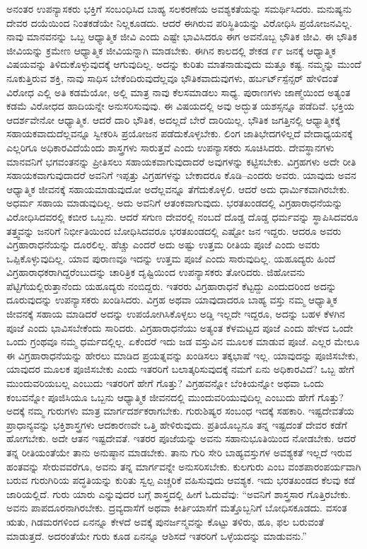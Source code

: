 ಅನಂತರ ಉಪನ್ಯಾಸಕರು ಭಕ್ತಿಗೆ ಸಂಬಂಧಿಸಿದ ಬಾಹ್ಯ ಸಲಕರಣೆಯ ಅವಶ್ಯಕತೆಯನ್ನು ಸಮರ್ಥಿಸಿದರು. ಮನುಷ್ಯನು ದೇವರ ದಯೆಯಿಂದ ನಿಂತಕಡೆಯೇ ನಿಲ್ಲಕೂಡದು. ಆದರೆ ಈಗಿರುವ ಪರಿಸ್ಥಿತಿಯನ್ನು ವಿರೋಧಿಸಿ ಪ್ರಯೋಜನವಿಲ್ಲ. ನಾವು ಮಾನವನನ್ನು ಒಬ್ಬ ಆಧ್ಯಾತ್ಮಿಕ ಜೀವಿ ಎಂದು ಎಷ್ಟೇ ಭಾವಿಸಿದರೂ ಈಗ ಅವನೊಬ್ಬ ಭೌತಿಕ ಜೀವಿ. ಈ ಭೌತಿಕ ಜೀವಿಯನ್ನು ಕ್ರಮೇಣ ಆಧ್ಯಾತ್ಮಿಕ ಜೀವಿಯನ್ನಾಗಿ ಮಾಡಬೇಕು. ಈಗಿನ ಕಾಲದಲ್ಲಿ ಶೇಕಡ ೯೯ ಜನಕ್ಕೆ ಆಧ್ಯಾತ್ಮಿಕ ವಿಷಯವನ್ನು ತಿಳಿದುಕೊಳ್ಳುವುದಕ್ಕೆ ಆಗುವುದಿಲ್ಲ. ಅದನ್ನು ಕುರಿತು ಮಾತನಾಡುವುದು ಮತ್ತೂ ಕಷ್ಟ. ನಮ್ಮನ್ನು ಮುಂದೆ ನೂಕುತ್ತಿರುವ ಶಕ್ತಿ, ನಾವು ಸಾಧಿಸ ಬೇಕೆಂದಿರುವುದೆಲ್ಲವೂ ಭೌತಿಕವಾದುವುಗಳು, ಹರ್ಬರ್ಟ್​ ಸ್ಪೆನ್ಸರ್​ ಹೇಳಿದಂತೆ ವಿರೋಧ ಎಲ್ಲಿ ಅತಿ ಕಡಮೆಯೋ, ಅಲ್ಲಿ ಮಾತ್ರ ನಾವು ಕೆಲಸಮಾಡಲು ಸಾಧ್ಯ. ಪುರಾಣಗಳು ಜಾಣ್ಮೆಯಿಂದ ಅತ್ಯಂತ ಕಡಮೆ ವಿರೋಧದ ಹಾದಿಯನ್ನೇ ಅನುಸರಿಸುವುವು. ಈ ವಿಷಯದಲ್ಲಿ ಅವು ಅದ್ಭುತ ಯಶಸ್ಸನ್ನೂ ಪಡೆದಿವೆ. ಭಕ್ತಿಯ ಆದರ್ಶವೇನೋ ಆಧ್ಯಾತ್ಮಿಕ. ಆದರೆ ದಾರಿ ಭೌತಿಕ, ಅದಲ್ಲದೆ ಬೇರೆ ದಾರಿಯಿಲ್ಲ. ಭೌತಿಕ ಜಗತ್ತಿನಲ್ಲಿ ಆಧ್ಯಾತ್ಮಿಕಕ್ಕೆ ಸಹಾಯಕವಾದುದೆಲ್ಲವನ್ನೂ ಸ್ವೀಕರಿಸಿ ಪ್ರಯೋಜನ ಪಡೆದುಕೊಳ್ಳಬೇಕು. ಲಿಂಗ ಜಾತಿಭೇದಗಳಿಲ್ಲದೆ ವೇದಾಧ್ಯಯನಕ್ಕೆ ಎಲ್ಲರಿಗೂ ಅಧಿಕಾರವಿದೆಯೆಂದು ಶಾಸ್ತ್ರಗಳು ಸಾರುತ್ತವೆ ಎಂದು ಉಪನ್ಯಾಸಕರು ಸೂಚಿಸಿದರು. ದೇವಸ್ಥಾನಗಳು ಮಾನವನಿಗೆ ಭಗವಂತನನ್ನು ಪ್ರೀತಿಸಲು ಸಹಾಯಕವಾಗುವುದಾದರೆ ಅವುಗಳನ್ನು ಕಟ್ಟಿಸಬೇಕು. ವಿಗ್ರಹಗಳು ಅದೇ ರೀತಿ ಸಹಾಯಕವಾಗುವುದಾದರೆ ಅವನಿಗೆ ಇಪ್ಪತ್ತು ವಿಗ್ರಹಗಳನ್ನು ಬೇಕಾದರೂ ಕೊಡಿ–ಎಂದರು ಅವರು. ಯಾವುದು ಅವನ ಆಧ್ಯಾತ್ಮಿಕ ಜೀವನಕ್ಕೆ ಸಹಾಯಮಾಡುವುದೋ ಅದೆಲ್ಲವನ್ನೂ ತೆಗೆದುಕೊಳ್ಳಲಿ. ಆದರೆ ಅದು ಧಾರ್ಮಿಕವಾಗಿರಬೇಕು. ಅಧರ್ಮ ಸಹಾಯ ಮಾಡುವುದಿಲ್ಲ. ಅದು ಅವನಿಗೆ ಆತಂಕವಾಗುವುದು. ಭರತಖಂಡದಲ್ಲಿ ವಿಗ್ರಹಾರಾಧನೆಯನ್ನು ವಿರೋಧಿಸಿದವರಲ್ಲಿ ಕಬೀರ ಒಬ್ಬನು. ಆದರೆ ಸಗುಣ ದೇವರಲ್ಲಿ ನಂಬದೆ ದೊಡ್ಡ ದೊಡ್ಡ ಧರ್ಮವನ್ನು ಸ್ಥಾಪಿಸಿದವರೂ ತತ್ತ್ವವನ್ನು ಜನರಿಗೆ ನಿರ್ಭೀತಿಯಿಂದ ಬೋಧಿಸಿದವರೂ ಭರತಖಂಡದಲ್ಲಿ ಎಷ್ಟೋ ಜನ ಇದ್ದರು. ಆದರೂ ಅವರು ವಿಗ್ರಹಾರಾಧನೆಯನ್ನು ದೂರಲಿಲ್ಲ. ಹೆಚ್ಚು ಎಂದರೆ ಅದು ಅಷ್ಟು ಉತ್ತಮ ರೀತಿಯ ಪೂಜೆ ಎಂದು ಅವರು ಒಪ್ಪಿಕೊಳ್ಳುವುದಿಲ್ಲ. ಯಾವ ಪುರಾಣವೂ ಇದನ್ನು ಉತ್ತಮ ಪೂಜೆ ಎಂದು ಸಾರುವುದಿಲ್ಲ. ಯಹೂದ್ಯರು ಹಿಂದೆ ವಿಗ್ರಹಾರಾಧಕರಾಗಿದ್ದರೆಂಬುದನ್ನು ಚಾರಿತ್ರಿಕ ದೃಷ್ಟಿಯಿಂದ ಉಪನ್ಯಾಸಕರು ತೋರಿದರು. ಜಿಹೋವನು ಪೆಟ್ಟಿಗೆಯಲ್ಲಿರುತ್ತಾನೆಂದು ಯಹೂದ್ಯರು ನಂಬಿದ್ದರು. ಇತರರು ವಿಗ್ರಹಾರಾಧನೆ ಕೆಟ್ಟದ್ದು ಎಂದುದರಿಂದ ಅದನ್ನು ದೂರುವುದನ್ನು ಉಪನ್ಯಾಸಕರು ಖಂಡಿಸಿದರು. ವಿಗ್ರಹ ಅಥವಾ ಯಾವುದಾದರೂ ಬಾಹ್ಯ ವಸ್ತು ನಮ್ಮ ಆಧ್ಯಾತ್ಮಿಕ ಜೀವನಕ್ಕೆ ಸಹಾಯ ಮಾಡಿದರೆ ಅದನ್ನು ಉಪಯೋಗಿಸಿಕೊಳ್ಳಲು ಅಡ್ಡಿ ಇಲ್ಲದೇ ಇದ್ದರೂ, ಅದನ್ನು ಬಹಳ ಕೆಳಗಿನ ಪೂಜೆ ಎಂದು ಭಾವಿಸಬೇಕೆಂದು ಸಾರಿದರು. ವಿಗ್ರಹಾರಾಧನೆಯು ಅತ್ಯಂತ ಕೆಳಮಟ್ಟದ ಪೂಜೆ ಎಂದು ಹೇಳದ ಒಂದೇ ಒಂದು ಗ್ರಂಥವೂ ನಮ್ಮ ಧರ್ಮದಲ್ಲಿಲ್ಲ. ಏಕೆಂದರೆ ಇದು ಜಡ ವಸ್ತುವಿನ ಮೂಲಕ ಮಾಡುವ ಪೂಜೆ. ಎಲ್ಲರ ಮೇಲೂ ಈ ವಿಗ್ರಹಾರಾಧನೆಯನ್ನು ಹೇರಲು ಮಾಡಿದ ಪ್ರಯತ್ನವನ್ನು ಖಂಡಿಸಲು ತಕ್ಕಭಾಷೆ ಇಲ್ಲ. ಯಾವುದನ್ನು ಪೂಜಿಸಬೇಕು, ಯಾವುದರ ಮೂಲಕ ಪೂಜಿಸಬೇಕು ಎಂದು ಇತರರಿಗೆ ಬಲಾತ್ಕರಿಸುವುದಕ್ಕೆ ನಮಗೆ ಏನು ಅಧಿಕಾರವಿದೆ? ಒಬ್ಬ ಹೇಗೆ ಮುಂದುವರಿಯಬಲ್ಲ ಎಂಬುದು ಇತರರಿಗೆ ಹೇಗೆ ಗೊತ್ತು? ವಿಗ್ರಹವನ್ನೋ ಬೆಂಕಿಯನ್ನೋ ಅಥವಾ ಒಂದು ಕಂಬವನ್ನೋ ಪೂಜಿಸಿಯೂ ಒಬ್ಬನು ಆಧ್ಯಾತ್ಮಿಕ ಜೀವನದಲ್ಲಿ ಮುಂದುವರಿಯುವುದಿಲ್ಲ ಎಂಬುದು ಹೇಗೆ ಗೊತ್ತು? ಅದಕ್ಕೆ ನಮ್ಮ ಗುರುಗಳು ಮಾತ್ರ ಮಾರ್ಗದರ್ಶಕರಾಗಬೇಕು. ಗುರುಶಿಷ್ಯರ ಸಂಬಂಧ ಇದಕ್ಕೆ ಸಹಕಾರಿ. ಇಷ್ಟದೇವತೆಯ ಪ್ರಾಧಾನ್ಯವನ್ನು ಭಕ್ತಿಶಾಸ್ತ್ರಗಳು ಆದಕಾರಣವೇ ಒತ್ತಿ ಹೇಳಿರುವುದು. ಪ್ರತಿಯೊಬ್ಬನೂ ತನ್ನ ಇಷ್ಟದಂತೆ ದೇವರ ಕಡೆಗೆ ಹೋಗಬೇಕು. ಅದೇ ಆತನ ಇಷ್ಟದೇವತೆ. ಇತರರ ಪೂಜೆಯನ್ನು ಅವನು ಸಹಾನುಭೂತಿಯಿಂದ ನೋಡಬೇಕು. ಆದರೆ ತನ್ನ ರೀತಿಯಂತೆಯೇ ತಾನು ಅನುಷ್ಠಾನ ಮಾಡಬೇಕು. ತಾನು ಗುರಿ ಸೇರಿ ಬಾಹ್ಯವಸ್ತುಗಳ ಅವಶ್ಯಕತೆ ಇಲ್ಲದೆ ಇರುವ ಹಂತವನ್ನು ಸೇರುವವರೆಗೂ, ಅವನು ತನ್ನ ಮಾರ್ಗವನ್ನೇ ಅನುಸರಿಸಬೇಕು. ಕುಲಗುರು ಎಂಬ ವಂಶಪಾರಂಪರ್ಯವಾಗಿ ಬರುವ ಗುರುಗಿರಿಯ ಪದ್ಧತಿಯನ್ನು ಕುರಿತು ಸ್ವಲ್ಪ ಎಚ್ಚರಿಕೆ ವಹಿಸುವುದು ಆವಶ್ಯಕ. ಇದು ಭರತಖಂಡದ ಕೆಲವು ಕಡೆ ಜಾರಿಯಲ್ಲಿದೆ. ಗುರು ಯಾರು ಎನ್ನುವುದರ ಬಗ್ಗೆ ಶಾಸ್ತ್ರದಲ್ಲಿ ಹೀಗೆ ಓದುವೆವು: “ಅವನಿಗೆ ಶಾಸ್ತ್ರಸಾರ ಗೊತ್ತಿರಬೇಕು. ಅವನು ಪಾಪದೂರನಾಗಿರಬೇಕು. ದ್ರವ್ಯದಾಸೆಗೆ ಅಥವಾ ಕೀರ್ತಿಯಾಸೆಗೆ ಮತ್ತೊಬ್ಬನಿಗೆ ಬೋಧಿಸಕೂಡದು. ವಸಂತ ಋತು, ಗಿಡಮರಗಳಿಂದ ಏನನ್ನೂ ಕೇಳದೆ ಅವಕ್ಕೆ ಪುನರ್ಜನ್ಮವನ್ನು ಕೊಟ್ಟು ತಳಿರು, ಹೂ, ಫಲ ಬರುವಂತೆ ಮಾಡುತ್ತದೆ. ಅದರಂತೆಯೇ ಗುರು ಕೂಡ ಏನನ್ನೂ ಆಶಿಸದೆ ಇತರರಿಗೆ ಒಳ್ಳೆಯದನ್ನು ಮಾಡುವನು.” 
